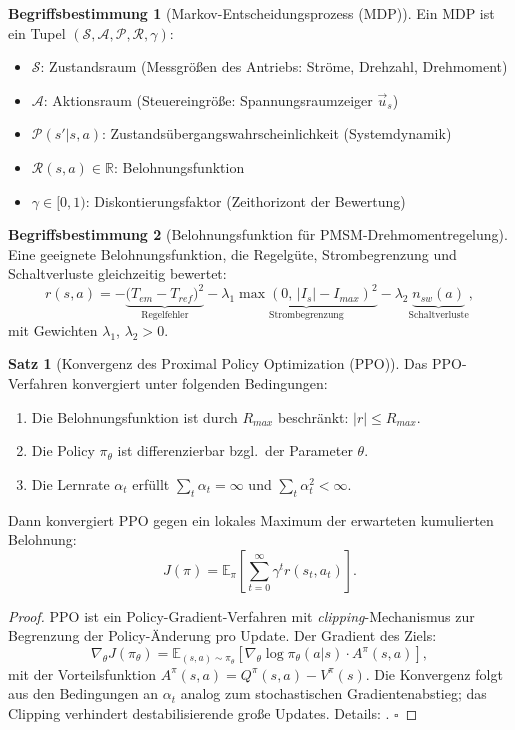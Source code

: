 ﻿\documentclass[a4paper,12pt,openany,oneside]{book}
\theoremstyle{definition}
\newtheorem{definition}{Begriffsbestimmung}[chapter]
\newtheorem{satz}{Satz}[chapter]
\begin{document}
\begin{definition}[Markov-Entscheidungsprozess (MDP)]
  Ein MDP ist ein Tupel $(\mathcal{S}, \mathcal{A}, \mathcal{P}, \mathcal{R}, \gamma)$:
  \begin{itemize}
    \item $\mathcal{S}$: Zustandsraum (Messgrößen des Antriebs: Ströme, Drehzahl, Drehmoment)
    \item $\mathcal{A}$: Aktionsraum (Steuereingröße: Spannungsraumzeiger $\vec{u}_s$)
    \item $\mathcal{P}(s'|s,a)$: Zustandsübergangswahrscheinlichkeit (Systemdynamik)
    \item $\mathcal{R}(s,a) \in \mathbb{R}$: Belohnungsfunktion
    \item $\gamma \in [0, 1)$: Diskontierungsfaktor (Zeithorizont der Bewertung)
  \end{itemize}
\end{definition}

\begin{definition}[Belohnungsfunktion f\"ur PMSM-Drehmomentregelung]
  Eine geeignete Belohnungsfunktion, die Regelg\"ute, Strombegrenzung und Schaltverluste
  gleichzeitig bewertet:
  \[
    r(s, a) = -\underbrace{\bigl(T_{em} - T_{ref}\bigr)^2}_{\text{Regelfehler}}
      - \lambda_1 \underbrace{\max(0,\, |I_s| - I_{max})^2}_{\text{Strombegrenzung}}
      - \lambda_2 \underbrace{n_{sw}(a)}_{\text{Schaltverluste}},
  \]
  mit Gewichten $\lambda_1$, $\lambda_2 > 0$.
\end{definition}

\begin{satz}[Konvergenz des Proximal Policy Optimization (PPO)]
  Das PPO-Verfahren konvergiert unter folgenden Bedingungen:
  \begin{enumerate}
    \item Die Belohnungsfunktion ist durch $R_{max}$ beschr\"ankt: $|r| \leq R_{max}$.
    \item Die Policy $\pi_\theta$ ist differenzierbar bzgl.\ der Parameter $\theta$.
    \item Die Lernrate $\alpha_t$ erf\"ullt $\sum_t \alpha_t = \infty$ und $\sum_t \alpha_t^2 < \infty$.
  \end{enumerate}
  Dann konvergiert PPO gegen ein lokales Maximum der erwarteten kumulierten Belohnung:
  \[
    J(\pi) = \mathbb{E}_{\pi}\!\left[\sum_{t=0}^{\infty}\gamma^t r(s_t, a_t)\right].
  \]
\end{satz}

\begin{proof}
  PPO ist ein Policy-Gradient-Verfahren mit \emph{clipping}-Mechanismus zur Begrenzung
  der Policy-\"Anderung pro Update. Der Gradient des Ziels:
  \[
    \nabla_\theta J(\pi_\theta) = \mathbb{E}_{(s,a)\sim\pi_\theta}\!
    \left[\nabla_\theta \log\pi_\theta(a|s) \cdot A^\pi(s,a)\right],
  \]
  mit der Vorteilsfunktion $A^\pi(s,a) = Q^\pi(s,a) - V^\pi(s)$.
  Die Konvergenz folgt aus den Bedingungen an $\alpha_t$ analog zum stochastischen
  Gradientenabstieg; das Clipping verhindert destabilisierende gro\ss{}e Updates.
  Details: \cite{Schulman2017}. \qquad$\square$
\end{proof}
\end{document}
